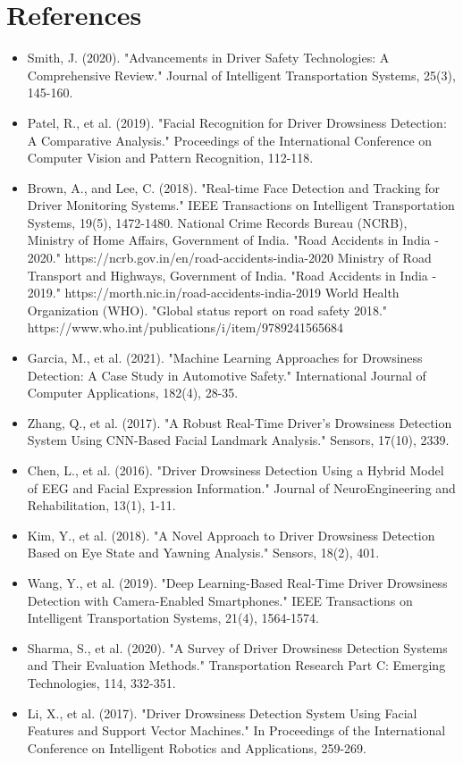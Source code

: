 \documentclass[12pt]{article}
\begin{document}
\section{ References }
\begin{itemize}
\item Smith, J. (2020). "Advancements in Driver Safety Technologies: A Comprehensive Review." Journal of Intelligent Transportation Systems, 25(3), 145-160.
\item Patel, R., et al. (2019). "Facial Recognition for Driver Drowsiness Detection: A Comparative Analysis." Proceedings of the International Conference on Computer Vision and Pattern Recognition, 112-118.
\item Brown, A., and Lee, C. (2018). "Real-time Face Detection and Tracking for Driver Monitoring Systems." IEEE Transactions on Intelligent Transportation Systems, 19(5), 1472-1480.
National Crime Records Bureau (NCRB), Ministry of Home Affairs, Government of India. "Road Accidents in India - 2020." https://ncrb.gov.in/en/road-accidents-india-2020
Ministry of Road Transport and Highways, Government of India. "Road Accidents in India - 2019." https://morth.nic.in/road-accidents-india-2019
World Health Organization (WHO). "Global status report on road safety 2018." https://www.who.int/publications/i/item/9789241565684
\item Garcia, M., et al. (2021). "Machine Learning Approaches for Drowsiness Detection: A Case Study in Automotive Safety." International Journal of Computer Applications, 182(4), 28-35.
\item Zhang, Q., et al. (2017). "A Robust Real-Time Driver's Drowsiness Detection System Using CNN-Based Facial Landmark Analysis." Sensors, 17(10), 2339.
\item Chen, L., et al. (2016). "Driver Drowsiness Detection Using a Hybrid Model of EEG and Facial Expression Information." Journal of NeuroEngineering and Rehabilitation, 13(1), 1-11.
\item Kim, Y., et al. (2018). "A Novel Approach to Driver Drowsiness Detection Based on Eye State and Yawning Analysis." Sensors, 18(2), 401.
\item Wang, Y., et al. (2019). "Deep Learning-Based Real-Time Driver Drowsiness Detection with Camera-Enabled Smartphones." IEEE Transactions on Intelligent Transportation Systems, 21(4), 1564-1574.
\item Sharma, S., et al. (2020). "A Survey of Driver Drowsiness Detection Systems and Their Evaluation Methods." Transportation Research Part C: Emerging Technologies, 114, 332-351.
\item Li, X., et al. (2017). "Driver Drowsiness Detection System Using Facial Features and Support Vector Machines." In Proceedings of the International Conference on Intelligent Robotics and Applications, 259-269.

\end{itemize}
\newpage
\end{document}
